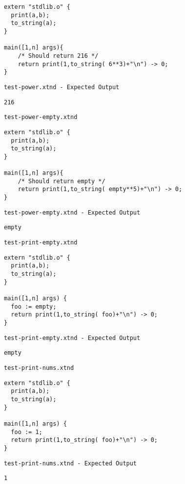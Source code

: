 \begin{lstlisting}
extern "stdlib.o" {
  print(a,b);
  to_string(a);
}

main([1,n] args){
	/* Should return 216 */
	return print(1,to_string( 6**3)+"\n") -> 0;
}
\end{lstlisting}


\medskip \noindent \texttt{test-power.xtnd - Expected Output}


\begin{lstlisting}
216
\end{lstlisting}


\medskip \noindent \texttt{test-power-empty.xtnd}


\begin{lstlisting}
extern "stdlib.o" {
  print(a,b);
  to_string(a);
}

main([1,n] args){
	/* Should return empty */
	return print(1,to_string( empty**5)+"\n") -> 0;
}
\end{lstlisting}


\medskip \noindent \texttt{test-power-empty.xtnd - Expected Output}


\begin{lstlisting}
empty
\end{lstlisting}


\medskip \noindent \texttt{test-print-empty.xtnd}


\begin{lstlisting}
extern "stdlib.o" {
  print(a,b);
  to_string(a);
}

main([1,n] args) {
  foo := empty;
  return print(1,to_string( foo)+"\n") -> 0;
}
\end{lstlisting}


\medskip \noindent \texttt{test-print-empty.xtnd - Expected Output}


\begin{lstlisting}
empty
\end{lstlisting}


\medskip \noindent \texttt{test-print-nums.xtnd}


\begin{lstlisting}
extern "stdlib.o" {
  print(a,b);
  to_string(a);
}

main([1,n] args) {
  foo := 1;
  return print(1,to_string( foo)+"\n") -> 0;
}
\end{lstlisting}


\medskip \noindent \texttt{test-print-nums.xtnd - Expected Output}


\begin{lstlisting}
1
\end{lstlisting}


